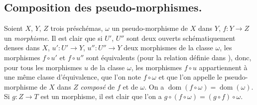 \subsection{Composition des pseudo-morphismes.}

\begin{env}[20.3.1]
Soient $X$, $Y$, $Z$ trois préschémas, $\omega$ un pseudo-morphisme de $X$ dans $Y$, $f:Y\to Z$ un \emph{morphisme}.
Il est clair que si $U'$, $U''$ sont deux ouverts schématiquement denses dans $X$, $u':U'\to Y$, $u'':U''\to Y$ deux morphismes de la classe $\omega$, les morphismes $f\circ u'$ et $f\circ u''$ sont équivalents (pour la relation définie dans ), donc, pour tous les morphismes $u$ de la classe $\omega$, les morphismes $f\circ u$ appartiennent à une même classe d'équivalence, que l'on note $f\circ\omega$ et que l'on appelle le pseudo-morphisme de $X$ dans $Z$ \emph{composé} de $f$ et de $\omega$.
On a $\operatorname{dom}(f\circ\omega)=\operatorname{dom}(\omega)$.
Si $g:Z\to T$ est un morphisme, il est clair que l'on a $g\circ(f\circ\omega)=(g\circ f)\circ\omega$.
\end{env}


